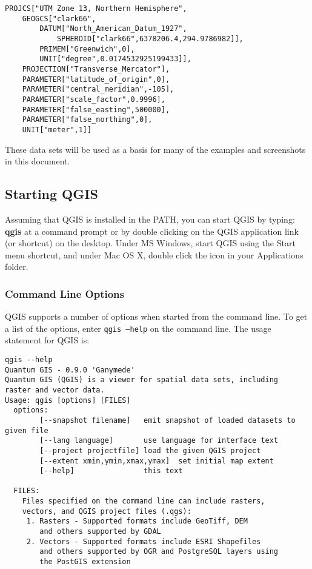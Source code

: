 \begin{verbatim}
PROJCS["UTM Zone 13, Northern Hemisphere",
    GEOGCS["clark66",
        DATUM["North_American_Datum_1927",
            SPHEROID["clark66",6378206.4,294.9786982]],
        PRIMEM["Greenwich",0],
        UNIT["degree",0.0174532925199433]],
    PROJECTION["Transverse_Mercator"],
    PARAMETER["latitude_of_origin",0],
    PARAMETER["central_meridian",-105],
    PARAMETER["scale_factor",0.9996],
    PARAMETER["false_easting",500000],
    PARAMETER["false_northing",0],
    UNIT["meter",1]]
\end{verbatim}

These data sets will be used as a basis for many of the examples and 
screenshots in this document.

\subsection{Starting QGIS}\label{label_startinqgis}

Assuming that QGIS is installed in the PATH, you can start QGIS by typing:
\textbf{qgis}  at a command prompt or by double clicking on the QGIS
application link (or shortcut) on the desktop. Under MS Windows, start QGIS
using the Start menu shortcut, and under Mac OS X, double click the icon in
your Applications folder. 

\subsubsection{Command Line Options}
\label{label_commandline}

QGIS supports a number of options when started from the command line. To
get a list of the options, enter \texttt{qgis ---help} on the command line.
The usage statement for QGIS is:

\small
\begin{verbatim}
qgis --help
Quantum GIS - 0.9.0 'Ganymede'
Quantum GIS (QGIS) is a viewer for spatial data sets, including
raster and vector data.
Usage: qgis [options] [FILES]
  options:
        [--snapshot filename]   emit snapshot of loaded datasets to given file
        [--lang language]       use language for interface text
        [--project projectfile] load the given QGIS project
        [--extent xmin,ymin,xmax,ymax]  set initial map extent
        [--help]                this text

  FILES:
    Files specified on the command line can include rasters,
    vectors, and QGIS project files (.qgs):
     1. Rasters - Supported formats include GeoTiff, DEM
        and others supported by GDAL
     2. Vectors - Supported formats include ESRI Shapefiles
        and others supported by OGR and PostgreSQL layers using
        the PostGIS extension
\end{verbatim}
\normalsize

